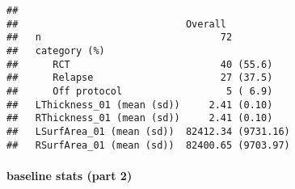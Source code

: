 \documentclass[]{article}
\newenvironment{Shaded}{\begin{snugshade}}{\end{snugshade}}
\newcommand{\KeywordTok}[1]{\textcolor[rgb]{0.13,0.29,0.53}{\textbf{#1}}}
\newcommand{\DataTypeTok}[1]{\textcolor[rgb]{0.13,0.29,0.53}{#1}}
\newcommand{\DecValTok}[1]{\textcolor[rgb]{0.00,0.00,0.81}{#1}}
\newcommand{\StringTok}[1]{\textcolor[rgb]{0.31,0.60,0.02}{#1}}
\newcommand{\OperatorTok}[1]{\textcolor[rgb]{0.81,0.36,0.00}{\textbf{#1}}}
\newcommand{\NormalTok}[1]{#1}
\let\oldparagraph\paragraph
\renewcommand{\paragraph}[1]{\oldparagraph{#1}\mbox{}}
\theoremstyle{definition}
\theoremstyle{definition}
\theoremstyle{definition}
\theoremstyle{remark}
\begin{document}
\begin{verbatim}
##                            
##                             Overall           
##   n                               72          
##   category (%)                                
##      RCT                          40 (55.6)   
##      Relapse                      27 (37.5)   
##      Off protocol                  5 ( 6.9)   
##   LThickness_01 (mean (sd))     2.41 (0.10)   
##   RThickness_01 (mean (sd))     2.41 (0.10)   
##   LSurfArea_01 (mean (sd))  82412.34 (9731.16)
##   RSurfArea_01 (mean (sd))  82400.65 (9703.97)
\end{verbatim}

\paragraph{baseline stats (part 2)}\label{baseline-stats-part-2}

\begin{Shaded}
\end{Shaded}
\end{document}
